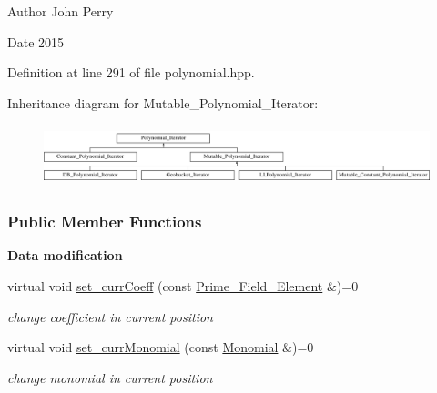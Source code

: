 \begin{DoxyAuthor}{Author}
John Perry 
\end{DoxyAuthor}
\begin{DoxyDate}{Date}
2015 
\end{DoxyDate}


Definition at line 291 of file polynomial.\+hpp.

Inheritance diagram for Mutable\+\_\+\+Polynomial\+\_\+\+Iterator\+:\begin{figure}[H]
\begin{center}
\leavevmode
\includegraphics[height=1.779661cm]{group___iterator_group}
\end{center}
\end{figure}
\subsubsection*{Public Member Functions}
\begin{Indent}\textbf{ Data modification}\par
\begin{DoxyCompactItemize}
\item 
\mbox{\label{group___iterator_group_a68d273d038b81b687559cf3e7f2c6df3}} 
virtual void \hyperlink{group___iterator_group_a68d273d038b81b687559cf3e7f2c6df3}{set\+\_\+curr\+Coeff} (const \hyperlink{group___fields_group_class_prime___field___element}{Prime\+\_\+\+Field\+\_\+\+Element} \&)=0
\begin{DoxyCompactList}\small\item\em change coefficient in current position \end{DoxyCompactList}\item 
\mbox{\label{group___iterator_group_aeb3668fd81e4284a84c8be4cd2416009}} 
virtual void \hyperlink{group___iterator_group_aeb3668fd81e4284a84c8be4cd2416009}{set\+\_\+curr\+Monomial} (const \hyperlink{group__polygroup_class_monomial}{Monomial} \&)=0
\begin{DoxyCompactList}\small\item\em change monomial in current position \end{DoxyCompactList}\end{DoxyCompactItemize}
\end{Indent}
